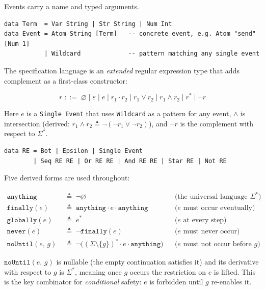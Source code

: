 \documentclass[acmsmall,screen]{acmart}
\newcommand{\anything}{\mathtt{anything}}
\newcommand{\finally}[1]{\mathtt{finally}(#1)}
\begin{document}
Events carry a name and typed arguments.

\begin{lstlisting}
data Term  = Var String | Str String | Num Int
data Event = Atom String [Term]   -- concrete event, e.g. Atom "send" [Num 1]
           | Wildcard             -- pattern matching any single event
\end{lstlisting}

The specification language is an \emph{extended} regular expression type
that adds complement as a first-class constructor:

\[
  r \;::=\; \varnothing \mid \varepsilon \mid e \mid r_1 \cdot r_2
          \mid r_1 \vee r_2 \mid r_1 \wedge r_2 \mid r^* \mid \neg r
\]

Here $e$ is a \lstinline{Single Event} that uses \lstinline{Wildcard} as a
pattern for any event, $\wedge$ is intersection (derived:
$r_1\wedge r_2 \triangleq \neg(\neg r_1\vee\neg r_2)$), and
$\neg r$ is the complement with respect to $\Sigma^*$.

\begin{lstlisting}
data RE = Bot | Epsilon | Single Event
        | Seq RE RE | Or RE RE | And RE RE | Star RE | Not RE
\end{lstlisting}

Five derived forms are used throughout:

\begin{align*}
  \anything &\;\triangleq\; \neg\varnothing
            &&\text{(the universal language } \Sigma^*\text{)} \\
  \finally{e} &\;\triangleq\; \anything \cdot e \cdot \anything
            &&\text{($e$ must occur eventually)} \\
  \mathtt{globally}(e) &\;\triangleq\; e^*
            &&\text{($e$ at every step)} \\
  \mathtt{never}(e) &\;\triangleq\; \neg\finally{e}
            &&\text{($e$ must never occur)} \\
  \mathtt{noUntil}(e,\,g) &\;\triangleq\;
            \neg\bigl((\Sigma\setminus\{g\})^* \cdot e \cdot \anything\bigr)
            &&\text{($e$ must not occur before $g$)}
\end{align*}

\noindent
$\mathtt{noUntil}(e,\,g)$ is nullable (the empty continuation satisfies it)
and its derivative with respect to $g$ is $\Sigma^*$, meaning once $g$ occurs
the restriction on $e$ is lifted.
This is the key combinator for \emph{conditional} safety: $e$ is forbidden
until $g$ re-enables it.
\end{document}
